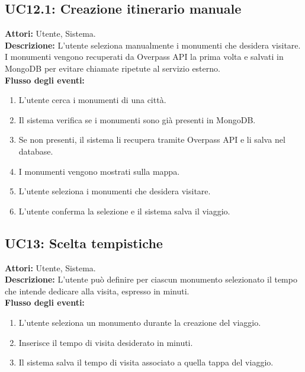 \subsection*{UC12.1: Creazione itinerario manuale}
\textbf{Attori:} Utente, Sistema. \\
\textbf{Descrizione:} L'utente seleziona manualmente i monumenti che desidera visitare. I monumenti vengono recuperati da Overpass API la prima volta e salvati in MongoDB per evitare chiamate ripetute al servizio esterno. \\
\textbf{Flusso degli eventi:}
\begin{enumerate}
    \setlength{\itemsep}{0pt}
    \setlength{\parskip}{0pt}
    \item L'utente cerca i monumenti di una città.
    \item Il sistema verifica se i monumenti sono già presenti in MongoDB.
    \item Se non presenti, il sistema li recupera tramite Overpass API e li salva nel database.
    \item I monumenti vengono mostrati sulla mappa.
    \item L'utente seleziona i monumenti che desidera visitare.
    \item L'utente conferma la selezione e il sistema salva il viaggio.
\end{enumerate}

\subsection*{UC13: Scelta tempistiche}
\textbf{Attori:} Utente, Sistema. \\
\textbf{Descrizione:} L'utente può definire per ciascun monumento selezionato il tempo che intende dedicare alla visita, espresso in minuti. \\
\textbf{Flusso degli eventi:}
\begin{enumerate}
    \setlength{\itemsep}{0pt}
    \setlength{\parskip}{0pt}
    \item L'utente seleziona un monumento durante la creazione del viaggio.
    \item Inserisce il tempo di visita desiderato in minuti.
    \item Il sistema salva il tempo di visita associato a quella tappa del viaggio.
\end{enumerate}

